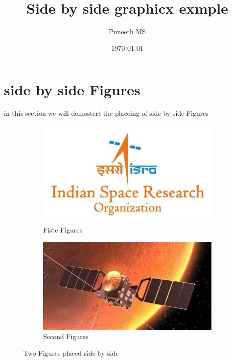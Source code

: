 \documentclass[a4paper,12pt]{article}
\begin{document}
\title{Side by side graphicx exmple}
\author{Puneeth MS}
\date{\today}
\maketitle
\section{side by side Figures}
in this section we will demostert the placeing of side by side Figures\par
\begin{figure}[h!]
    \centering
    \begin{subfigure}[b]{0.45\textwidth}
        \centering
        \includegraphics[width=\textwidth]{puneeth2.jpg}
        \caption{Fiste Figures}
        \label{fig:fig1}
    \end{subfigure}
    \hfill
    \begin{subfigure}[b]{0.45\textwidth}
        \centering
        \includegraphics[width=\textwidth]{puneeth3.jpeg}
        \caption{Second Figures}
        \label{fig:fig2}
    \end{subfigure}
    \caption{Two Figures placed side by side}
    \label{fig:side by side}
\end{figure}
\end{document}

